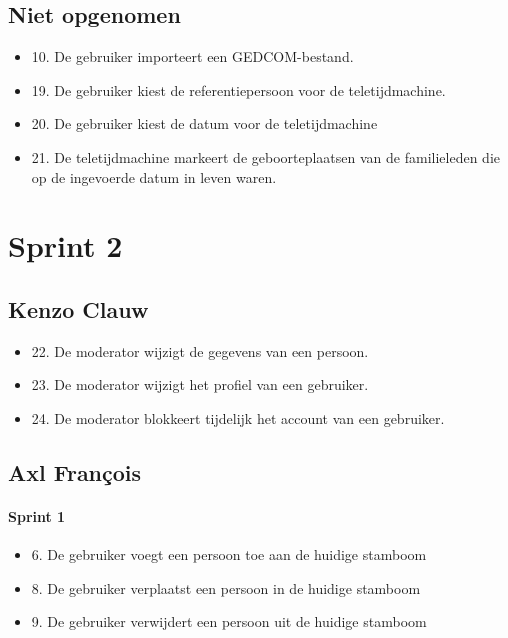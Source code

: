 \documentclass[pdftex,a4paper,12pt,twoside]{report}
\begin{document}
\subsection{Niet opgenomen}
\begin{itemize}
\item 10. De gebruiker importeert een GEDCOM-bestand. 
\item 19. De gebruiker kiest de referentiepersoon voor de teletijdmachine. 
\item 20. De gebruiker kiest de datum voor de teletijdmachine
\item 21. De teletijdmachine markeert de geboorteplaatsen van de familieleden die op de ingevoerde 
datum in leven waren. 
\end{itemize}

\section{Sprint 2}

\subsection{Kenzo Clauw}
\begin{itemize}
\item 22. De moderator wijzigt de gegevens van een persoon. 
\item 23. De moderator wijzigt het profiel van een gebruiker. 
\item 24. De moderator blokkeert tijdelijk het account van een gebruiker. 
\end{itemize}

\subsection{Axl François}
\paragraph{Sprint 1}
\begin{itemize}
\item 6. De gebruiker voegt een persoon toe aan de huidige stamboom 
\item 8. De gebruiker verplaatst een persoon in de huidige stamboom 
\item 9. De gebruiker verwijdert een persoon uit de huidige stamboom
\end{itemize}
\end{document}
